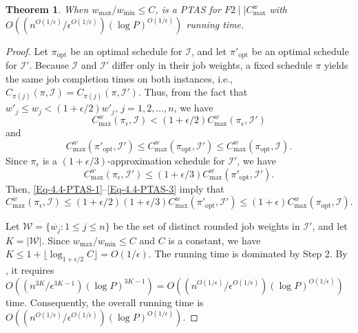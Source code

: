 \documentclass[12pt]{article} \textheight=24.5cm \textwidth=16.5cm \parskip = 0.165cm
\newtheorem{theorem}{Theorem}[section]
\begin{document}
\begin{sloppypar}
        \begin{theorem} \label{Theorem-PTAS}
            When $w_{\max}/w_{\min} \leq C$,  is a PTAS for $F2 \mid \mid C_{\max}^w$ with $O((n^{O(1/\epsilon)}/\epsilon^{O(1/\epsilon)}) (\log P)^{O(1/\epsilon)})$ running time.
        \end{theorem}
        
        \begin{proof}
            Let $\pi_{\mathrm{opt}}$ be an optimal schedule for $\mathcal{I}$, and let $\pi'_{\mathrm{opt}}$ be an optimal schedule for $\mathcal{I}'$.
            Because $\mathcal{I}$ and $\mathcal{I}'$ differ only in their job weights, a fixed schedule $\pi$ yields the same job completion times on both instances, i.e., $C_{\pi(j)}(\pi,\mathcal{I})=C_{\pi(j)}(\pi, \mathcal{I}')$.
            Thus, from the fact that $w'_j \leq w_j < (1+\epsilon/2) w'_j$, $j=1, 2, \ldots, n$, we have
            \begin{equation} \label{Eq-4.4-PTAS-1}
                C_{\max}^w(\pi_{\epsilon}, \mathcal{I}) < (1+\epsilon/2)C_{\max}^w(\pi_{\epsilon}, \mathcal{I}')
            \end{equation}
            and
            \begin{equation} \label{Eq-4.4-PTAS-2}
                C_{\max}^w(\pi'_{\mathrm{opt}}, \mathcal{I}') \leq C_{\max}^w(\pi_{\mathrm{opt}}, \mathcal{I}') \leq C_{\max}^w(\pi_{\mathrm{opt}}, \mathcal{I}).
            \end{equation}
            Since $\pi_{\epsilon}$ is a $(1+\epsilon/3)$-approximation schedule for $\mathcal{I}'$, we have
            \begin{equation} \label{Eq-4.4-PTAS-3}
                C_{\max}^w(\pi_{\epsilon}, \mathcal{I}') \leq (1+\epsilon/3) C_{\max}^w(\pi'_{\mathrm{opt}}, \mathcal{I}').
            \end{equation}
            Then, \cref{Eq-4.4-PTAS-1}--\cref{Eq-4.4-PTAS-3} imply that
            \begin{equation*}
                C_{\max}^w(\pi_{\epsilon}, \mathcal{I}) \leq (1+\epsilon/2) (1+\epsilon/3) C_{\max}^w(\pi'_{\mathrm{opt}}, \mathcal{I}')  \leq  (1+\epsilon)C_{\max}^w(\pi_{\mathrm{opt}},\mathcal{I}).
            \end{equation*}
            
            Let $\mathcal{W}=\{\overline{w_j}: 1 \leq j \leq n\}$ be the set of distinct rounded job weights in $\mathcal{I}'$, and let $K=|\mathcal{W}|$.
            Since $w_{\max}/w_{\min} \leq C$ and $C$ is a constant, we have $K \leq 1+ \lfloor \log_{1+\epsilon/2} C \rfloor =O(1/\epsilon)$.
            The running time is dominated by Step 2.
            By , it requires $O((n^{3K}/\epsilon^{3K-1}) (\log P)^{3K-1})=O((n^{O(1/\epsilon)}/\epsilon^{O(1/\epsilon)}) (\log P)^{O(1/\epsilon)})$ time.
            Consequently, the overall running time is $O((n^{O(1/\epsilon)}/\epsilon^{O(1/\epsilon)}) (\log P)^{O(1/\epsilon)})$.
        \end{proof}
        

\end{sloppypar}
\end{document}
